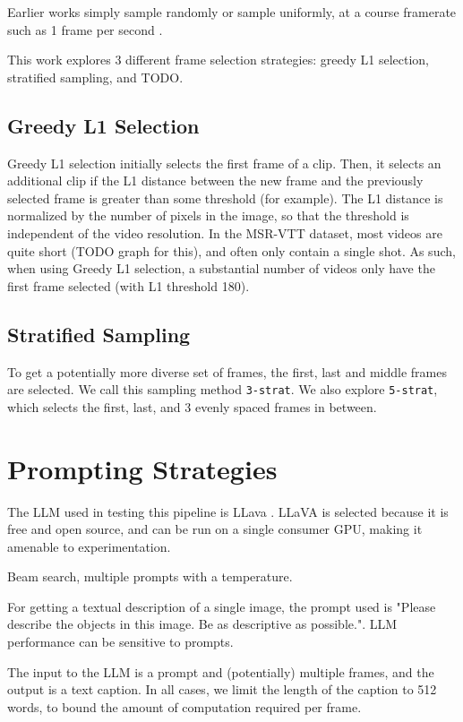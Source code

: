 \documentclass{article}
\begin{document}
Earlier works simply sample randomly \cite{TODO} or sample uniformly, at a course framerate such as 1 frame per second \cite{clip4clip}.

This work explores 3 different frame selection strategies:
greedy L1 selection, stratified sampling, and TODO.

\subsection{Greedy L1 Selection}
Greedy L1 selection initially selects the first frame of a clip. Then, it selects an additional clip if the L1 distance between the new frame and the previously selected frame is greater than some threshold (for example).
The L1 distance is normalized by the number of pixels in the image, so that the threshold is independent of the video resolution.
In the MSR-VTT dataset, most videos are quite short (TODO graph for this), and often only contain a single shot.
As such, when using Greedy L1 selection, a substantial number of videos only have the first frame selected (with L1 threshold 180).

\subsection{Stratified Sampling}
To get a potentially more diverse set of frames, the first, last and middle frames are selected.
We call this sampling method \verb|3-strat|. We also explore \verb|5-strat|, which selects the first, last, and 3 evenly spaced frames in between.

\section{Prompting Strategies}

The LLM used in testing this pipeline is LLava \cite{llava}.
LLaVA is selected because it is free and open source, and can be run on a single consumer GPU, making it amenable to experimentation.

Beam search, multiple prompts with a temperature.

For getting a textual description of a single image, the prompt used is "Please describe the objects in this image. Be as descriptive as possible.".
LLM performance can be sensitive to prompts.

The input to the LLM is a prompt and (potentially) multiple frames, and the output is a text caption.
In all cases, we limit the length of the caption to 512 words, to bound the amount of computation required per frame.
\end{document}
